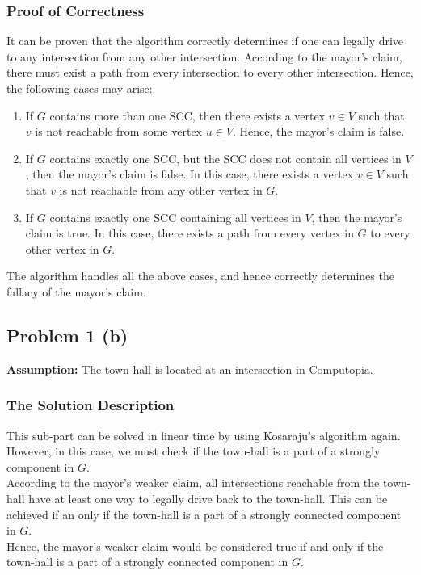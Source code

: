\documentclass[12pt]{report}
\begin{document}
    \subsubsection*{Proof of Correctness}
    It can be proven that the algorithm correctly determines if one can legally drive to any intersection from any other intersection.
    According to the mayor's claim, there must exist a path from every intersection to every other intersection.
    Hence, the following cases may arise:
    \begin{enumerate}
        \item
        If $G$ contains more than one SCC, then there exists a vertex $v \in V$ such that $v$ is not reachable from some vertex $u \in V$.
        Hence, the mayor's claim is false.
        \item
        If $G$ contains exactly one SCC, but the SCC does not contain all vertices in $V$, then the mayor's claim is false.
        In this case, there exists a vertex $v \in V$ such that $v$ is not reachable from any other vertex in $G$.
        \item
        If $G$ contains exactly one SCC containing all vertices in $V$, then the mayor's claim is true.
        In this case, there exists a path from every vertex in $G$ to every other vertex in $G$.
    \end{enumerate}
    The algorithm handles all the above cases, and hence correctly determines the fallacy of the mayor's claim.

    \subsection*{Problem 1 (b)}
    \textbf{Assumption:} The town-hall is located at an intersection in Computopia.

    \subsubsection*{The Solution Description}
    This sub-part can be solved in linear time by using Kosaraju's algorithm again.
    However, in this case, we must check if the town-hall is a part of a strongly component in $G$. \\
    According to the mayor's weaker claim, all intersections reachable from the town-hall have at least one way to legally drive back to the town-hall.
    This can be achieved if an only if the town-hall is a part of a strongly connected component in $G$. \\
    Hence, the mayor's weaker claim would be considered true if and only if the town-hall is a part of a strongly connected component in $G$.
\end{document}
